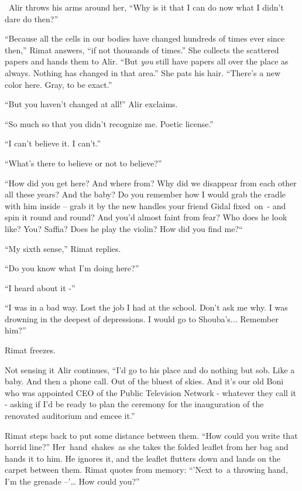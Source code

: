\documentclass[twoside,11pt]{book}
\begin{document}
~Alir throws his arms around her, ``Why is it that I can do now what I didn't dare do then?''

``Because all the cells in our bodies have changed hundreds of times ever since then,'' Rimat
answers, ``if not thousands of times.'' She collects the scattered papers and hands them to
Alir. ``But \textit{you} still have papers all over the place as always. Nothing has changed in that
area.'' She pats his hair. ``There's a new color here. Gray, to be exact.'' 

``But you haven't changed at all!'' Alir exclaims.

``So much so that you didn't recognize me. Poetic license.'' 

``I can't believe it. I can't.'' 

``What's there to believe or not to believe?'' 

``How did you get here? And where from? Why did we disappear from each other all these years? And the baby?
Do you remember how I would grab the cradle with him inside -- grab it by the new handles your friend Gidal
fixed{\ }on{\ }{}-
and spin it round and round? And you'd almost faint from fear? Who does he look like? You? Saffia? Does he play the
violin? How did you find me?``\ 

``My sixth sense,'' Rimat replies. 

``Do you know what I'm doing here?'' 

``I heard about it -''

``I was in a bad way. Lost the job I had at the school. Don't ask me why. I was drowning in the deepest of
depressions. I would go to Shouba's... Remember him?''

Rimat freezes.

Not sensing it Alir continues, ``I'd go to his place and do nothing but sob. Like a baby. And then a phone
call. Out of the bluest of skies. And it's our old Boni who was appointed CEO of the Public Television Network -
whatever they call it - asking if I'd be ready to plan the ceremony for the inauguration of the renovated auditorium
and emcee it.'' 

Rimat steps back to put some distance between them. ``How could you write that horrid line?''
Her\ hand\ shakes\ as she takes the folded leaflet from her bag and hands it to him. He ignores it, and the leaflet
flutters down and lands on the carpet between them. Rimat quotes from memory: ``'Next to~a throwing hand,
I'm the grenade --'{\dots} How could you?'' 
\end{document}
